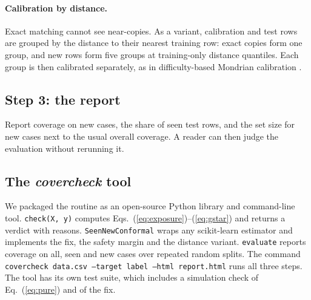 \paragraph{Calibration by distance.} Exact matching cannot see near-copies. As a variant, calibration and test rows are grouped by the distance to their nearest training row: exact copies form one group, and new rows form five groups at training-only distance quantiles. Each group is then calibrated separately, as in difficulty-based Mondrian calibration \citep{bostrom2020}.

\subsection{Step 3: the report}
Report coverage on new cases, the share of seen test rows, and the set size for new cases next to the usual overall coverage. A reader can then judge the evaluation without rerunning it.

\subsection{The \emph{covercheck} tool}\label{sec:tool}
We packaged the routine as an open-source Python library and command-line tool. \texttt{check(X, y)} computes Eqs.~(\ref{eq:exposure})--(\ref{eq:gstar}) and returns a verdict with reasons. \texttt{SeenNewConformal} wraps any scikit-learn estimator and implements the fix, the safety margin and the distance variant. \texttt{evaluate} reports coverage on all, seen and new cases over repeated random splits. The command \texttt{covercheck data.csv --target label --html report.html} runs all three steps. The tool has its own test suite, which includes a simulation check of Eq.~(\ref{eq:pure}) and of the fix.
